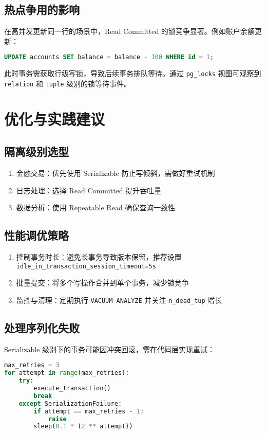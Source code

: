 \section{热点争用的影响}
在高并发更新同一行的场景中，Read Committed 的锁竞争显著。例如账户余额更新：\par
\begin{lstlisting}[language=sql]
UPDATE accounts SET balance = balance - 100 WHERE id = 1;
\end{lstlisting}
此时事务需获取行级写锁，导致后续事务排队等待。通过 \texttt{pg\_{}locks} 视图可观察到 \texttt{relation} 和 \texttt{tuple} 级别的锁等待事件。\par
\chapter{优化与实践建议}
\section{隔离级别选型}
\begin{enumerate}
\item 金融交易：优先使用 Serializable 防止写倾斜，需做好重试机制
\item 日志处理：选择 Read Committed 提升吞吐量
\item 数据分析：使用 Repeatable Read 确保查询一致性
\end{enumerate}
\section{性能调优策略}
\begin{enumerate}
\item 控制事务时长：避免长事务导致版本保留，推荐设置 \texttt{idle\_{}in\_{}transaction\_{}session\_{}timeout=5s}
\item 批量提交：将多个写操作合并到单个事务，减少锁竞争
\item 监控与清理：定期执行 \texttt{VACUUM ANALYZE} 并关注 \texttt{n\_{}dead\_{}tup} 增长
\end{enumerate}
\section{处理序列化失败}
Serializable 级别下的事务可能因冲突回滚，需在代码层实现重试：\par
\begin{lstlisting}[language=python]
max_retries = 3
for attempt in range(max_retries):
    try:
        execute_transaction()
        break
    except SerializationFailure:
        if attempt == max_retries - 1:
            raise
        sleep(0.1 * (2 ** attempt))
\end{lstlisting}
